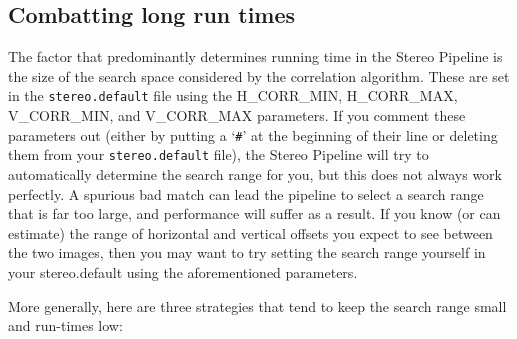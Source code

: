 \subsection{Combatting long run times}

The factor that predominantly determines running time in the Stereo
Pipeline is the size of the search space considered by the correlation
algorithm.  These are set in the \texttt{stereo.default} file using
the H\_CORR\_MIN, H\_CORR\_MAX, V\_CORR\_MIN, and V\_CORR\_MAX
parameters.  If you comment these parameters out (either by putting
a `\texttt{\#}' at the beginning of their line or deleting them from
your \texttt{stereo.default} file), the Stereo Pipeline will try to
automatically determine the search range for you, but this does not
always work perfectly.  A spurious bad match can lead the pipeline
to select a search range that is far too large, and performance
will suffer as a result.  If you know (or can estimate) the range
of horizontal and vertical offsets you expect to see between the
two images, then you may want to try setting the search range
yourself in your stereo.default using the aforementioned parameters.

More generally, here are three strategies that tend to keep the
search range small and run-times low:

